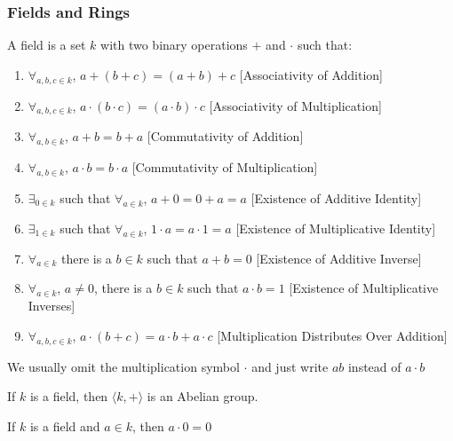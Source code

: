 \documentclass[crop=false,class=article,oneside]{standalone}
\begin{document}
            \subsubsection{Fields and Rings}
            \begin{definition}
            A field is a set $k$ with two binary operations $+$ and $\cdot$ such that:
            \begin{enumerate}
                \item $\forall_{a,b,c\in k}$, $a+(b+c)=(a+b)+c$ \hfill [Associativity of Addition]
                \item $\forall_{a,b,c\in k}$, $a\cdot(b\cdot c) = (a\cdot b)\cdot c$ \hfill [Associativity of Multiplication]
                \item $\forall_{a,b\in k}$, $a+b=b+a$ \hfill [Commutativity of Addition]
                \item $\forall_{a,b\in k}$, $a\cdot b = b\cdot a$ \hfill [Commutativity of Multiplication]
                \item $\exists_{0 \in k}$ such that $\forall_{a\in k}$, $a+0=0+a = a$ \hfill [Existence of Additive Identity]
                \item $\exists_{1\in k}$ such that $\forall_{a\in k}$, $1\cdot a=a\cdot 1 = a$ \hfill [Existence of Multiplicative Identity]
                \item $\forall_{a\in k}$ there is a $b\in k$ such that $a+b=0$ \hfill [Existence of Additive Inverse]
                \item $\forall_{a\in k}$, $a\ne 0$, there is a $b\in k$ such that $a\cdot b = 1$ \hfill [Existence of Multiplicative Inverses]
                \item $\forall_{a,b,c\in k}$, $a\cdot(b+c) = a\cdot b + a\cdot c$ \hfill [Multiplication Distributes Over Addition]
            \end{enumerate}
            \end{definition}
            \begin{remark}
            We usually omit the multiplication symbol $\cdot$ and just write $ab$ instead of $a\cdot b$
            \end{remark}
            \begin{theorem}
            If $k$ is a field, then $\langle k, + \rangle$ is an Abelian group.
            \end{theorem}
            \begin{theorem}
            If $k$ is a field and $a\in k$, then $a\cdot 0 = 0$
            \end{theorem}
\end{document}
